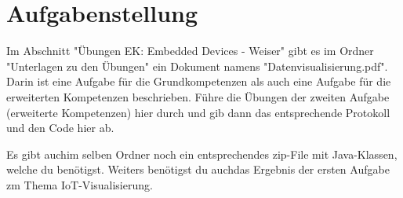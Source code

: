 \section{Aufgabenstellung}
Im Abschnitt "Übungen EK: Embedded Devices - Weiser" gibt es im Ordner "Unterlagen zu den Übungen" ein Dokument namens "Datenvisualisierung.pdf". Darin ist eine Aufgabe für die Grundkompetenzen als auch eine Aufgabe für die erweiterten Kompetenzen beschrieben. Führe die Übungen der zweiten Aufgabe (erweiterte Kompetenzen) hier durch und gib dann das entsprechende Protokoll und den Code hier ab.

Es gibt auchim selben Ordner noch ein entsprechendes zip-File mit Java-Klassen, welche du benötigst. Weiters benötigst du auchdas Ergebnis der ersten Aufgabe zm Thema IoT-Visualisierung.


